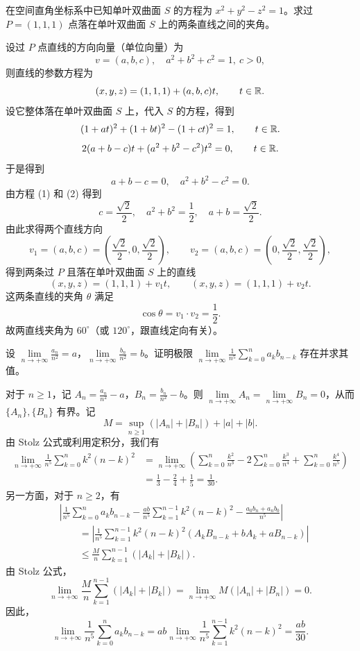 
在空间直角坐标系中已知单叶双曲面 $S$ 的方程为 $x^2+y^2-z^2=1$。求过 $P=(1,1,1)$ 点落在单叶双曲面 $S$ 上的两条直线之间的夹角。
\begin{solution}
设过 $P$ 点直线的方向向量（单位向量）为
\begin{equation}\tag{1}
v=(a,b,c),\quad a^2+b^2+c^2=1,\ c>0,
\end{equation}
则直线的参数方程为
\[
(x,y,z)=(1,1,1)+(a,b,c)t,\qquad t\in\mathbb{R}.
\]
设它整体落在单叶双曲面 $S$ 上，代入 $S$ 的方程，得到
\[
(1+at)^2+(1+bt)^2-(1+ct)^2=1,\qquad t\in\mathbb{R}.
\]
\[
2(a+b-c)t+(a^2+b^2-c^2)t^2=0,\qquad t\in\mathbb{R}.
\]
于是得到
\begin{equation}\tag{2}
a+b-c=0,\quad a^2+b^2-c^2=0.
\end{equation}
由方程 (1) 和 (2) 得到
\[
c=\frac{\sqrt2}{2},\quad a^2+b^2=\frac12,\quad a+b=\frac{\sqrt2}{2}.
\]
由此求得两个直线方向
\[
v_1=(a,b,c)=\left(\frac{\sqrt2}{2},0,\frac{\sqrt2}{2}\right),\qquad
v_2=(a,b,c)=\left(0,\frac{\sqrt2}{2},\frac{\sqrt2}{2}\right),
\]
得到两条过 $P$ 且落在单叶双曲面 $S$ 上的直线
\[
(x,y,z)=(1,1,1)+v_1t,\qquad (x,y,z)=(1,1,1)+v_2t.
\]
这两条直线的夹角 $\theta$ 满足
\[
\cos\theta=v_1\cdot v_2=\frac12.
\]
故两直线夹角为 $60^\circ$（或 $120^\circ$，跟直线定向有关）。
\end{solution}

设 $\lim\limits_{n\to+\infty}\frac{a_n}{n^2}=a$，$\lim\limits_{n\to+\infty}\frac{b_n}{n^2}=b$。证明极限
$\lim\limits_{n\to+\infty}\frac{1}{n^5}\sum\limits_{k=0}^{n}a_kb_{n-k}$
存在并求其值。
\begin{solution}
对于 $n\ge1$，记 $A_n=\frac{a_n}{n^2}-a$，$B_n=\frac{b_n}{n^2}-b$。则
$\lim\limits_{n\to+\infty}A_n=\lim\limits_{n\to+\infty}B_n=0$，从而 $\{A_n\},\{B_n\}$ 有界。记
\[
M=\sup_{n\ge1}\left(|A_n|+|B_n|\right)+|a|+|b|.
\]
由 Stolz 公式或利用定积分，我们有
\begin{align*}
\lim_{n\to+\infty}\frac{1}{n^5}\sum_{k=0}^{n}k^2(n-k)^2
&=\lim_{n\to+\infty}\left(\sum_{k=0}^{n}\frac{k^2}{n^3}-2\sum_{k=0}^{n}\frac{k^3}{n^4}+\sum_{k=0}^{n}\frac{k^4}{n^5}\right)\\
&=\frac13-\frac24+\frac15=\frac{1}{30}.
\end{align*}
另一方面，对于 $n\ge2$，有
\begin{align*}
&\left|\frac{1}{n^5}\sum_{k=0}^{n}a_kb_{n-k}-\frac{ab}{n^5}\sum_{k=1}^{n-1}k^2(n-k)^2-\frac{a_0b_n+a_nb_0}{n^5}\right|\\
&\qquad=\left|\frac{1}{n^5}\sum_{k=1}^{n-1}k^2(n-k)^2\left(A_kB_{n-k}+bA_k+aB_{n-k}\right)\right|\\
&\qquad\le\frac{M}{n}\sum_{k=1}^{n-1}\left(|A_k|+|B_k|\right).
\end{align*}
由 Stolz 公式，
\[
\lim_{n\to+\infty}\frac{M}{n}\sum_{k=1}^{n-1}\left(|A_k|+|B_k|\right)
=\lim_{n\to+\infty}M\left(|A_n|+|B_n|\right)=0.
\]
因此，
\[
\lim_{n\to+\infty}\frac{1}{n^5}\sum_{k=0}^{n}a_kb_{n-k}
=ab\lim_{n\to+\infty}\frac{1}{n^5}\sum_{k=1}^{n-1}k^2(n-k)^2=\frac{ab}{30}.
\]
\end{solution}

